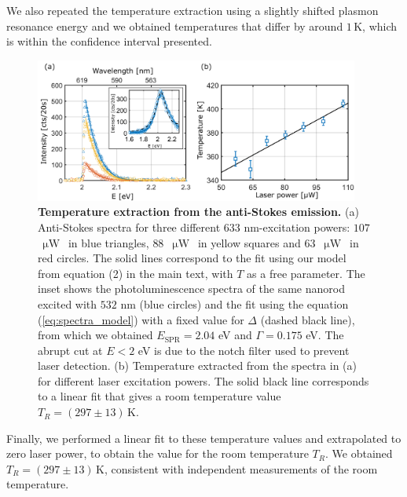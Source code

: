 \documentclass[journal=nalefd,manuscript=letter]{achemso}
\newcommand{\K}{\ensuremath{\,\textrm{K}}}
\newcommand{\uW}{\ensuremath{\,\upmu\textrm{W}}}
\begin{document}
We also repeated the temperature extraction using a slightly shifted plasmon resonance energy and we obtained temperatures that differ by around $1\K$, which is within the confidence interval presented. 

\begin{figure}[htp] \centering
\includegraphics[width=0.95\textwidth]{Figures/Supplementary/09_Error_vs_Wavelength/Temp_error.png}
\caption{\textbf{Temperature extraction from the anti-Stokes emission.} 
(a) Anti-Stokes spectra for three different $633$ nm-excitation powers: $107$ \uW~in 
blue triangles, $88$ \uW~in yellow squares and $63$ \uW~in red circles. 
The solid lines correspond to the fit using our model from equation (2) in the main text, 
with $T$ as a free parameter. The inset shows the photoluminescence spectra of the same 
nanorod excited with $532$ nm (blue circles) and the fit using the equation 
(\ref{eq:spectra_model}) with a fixed value for $\Delta$ (dashed black line), from which 
we obtained $E_\textrm{SPR}=2.04$ eV and $\Gamma=0.175$ eV. The abrupt cut at $E<2$ eV is due to the
notch filter used to prevent laser detection.  
(b) Temperature extracted from the spectra in (a) for different laser excitation powers. 
The solid black line corresponds to a linear fit that gives a room temperature value $T_R = (297 \pm 13)\K$.}
\label{fig:as_fit}
\end{figure}

Finally, we performed a linear fit to these temperature values and extrapolated to 
zero laser power, to obtain the value for the room temperature $T_R$. 
We obtained $T_R = (297 \pm 13)\K$, consistent with independent measurements of the room temperature. 



%
\end{document}
